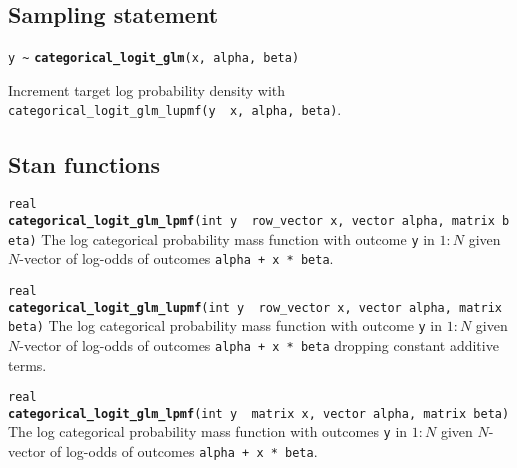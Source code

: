 \documentclass[
  10pt,
]{book}
\begin{document}
\hypertarget{sampling-statement-9}{%
\subsection{Sampling statement}\label{sampling-statement-9}}

\texttt{y\ \textasciitilde{}} \textbf{\texttt{categorical\_logit\_glm}}\texttt{(x,\ alpha,\ beta)}

Increment target log probability density with \texttt{categorical\_logit\_glm\_lupmf(y\ \textbar{}\ x,\ alpha,\ beta)}.

\hypertarget{stan-functions-8}{%
\subsection{Stan functions}\label{stan-functions-8}}


\texttt{real} \textbf{\texttt{categorical\_logit\_glm\_lpmf}}\texttt{(int\ y\ \textbar{}\ row\_vector\ x,\ vector\ alpha,\ matrix\ beta)}\newline
The log categorical probability mass function with outcome \texttt{y} in
\(1:N\) given \(N\)-vector of log-odds of outcomes \texttt{alpha\ +\ x\ *\ beta}.


\texttt{real} \textbf{\texttt{categorical\_logit\_glm\_lupmf}}\texttt{(int\ y\ \textbar{}\ row\_vector\ x,\ vector\ alpha,\ matrix\ beta)}\newline
The log categorical probability mass function with outcome \texttt{y} in
\(1:N\) given \(N\)-vector of log-odds of outcomes \texttt{alpha\ +\ x\ *\ beta}
dropping constant additive terms.


\texttt{real} \textbf{\texttt{categorical\_logit\_glm\_lpmf}}\texttt{(int\ y\ \textbar{}\ matrix\ x,\ vector\ alpha,\ matrix\ beta)}\newline
The log categorical probability mass function with outcomes \texttt{y} in
\(1:N\) given \(N\)-vector of log-odds of outcomes \texttt{alpha\ +\ x\ *\ beta}.
\end{document}
